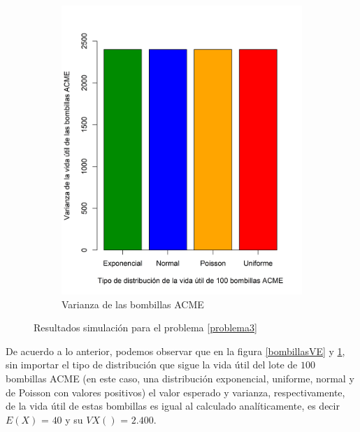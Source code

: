 \documentclass{article}
\begin{document}
\begin{figure}[h]
\begin{center}
\begin{subfigure}[b]{0.5\textwidth}
        \includegraphics[scale=0.5]{Figures/VarBombillas.png}
        \caption{Varianza de las bombillas ACME}
        \label{bombillasVar}
    \end{subfigure}
    \caption{Resultados simulación para el problema \ref{problema3}}
    \label{bombillas}
    \end{center}
\end{figure}

De acuerdo a lo anterior, podemos observar que en la figura \ref{bombillasVE} y \ref{bombillasVar}, sin importar el tipo de distribución que sigue la vida útil del lote de $100$ bombillas ACME (en este caso, una distribución exponencial, uniforme, normal y de Poisson con valores positivos) el valor esperado y varianza, respectivamente, de la vida útil de estas bombillas es igual al calculado analíticamente, es decir $E{(X)}$ = $40$ y su $V{X()}$ = $2.400$.



\end{document}

